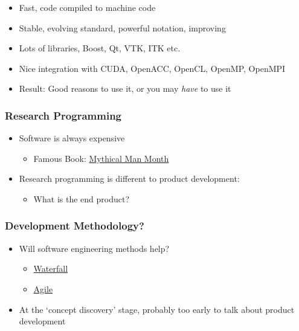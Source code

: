 \begin{itemize}
\tightlist
\item
  Fast, code compiled to machine code
\item
  Stable, evolving standard, powerful notation, improving
\item
  Lots of libraries, Boost, Qt, VTK, ITK etc.
\item
  Nice integration with CUDA, OpenACC, OpenCL, OpenMP, OpenMPI
\item
  Result: Good reasons to use it, or you may \emph{have} to use it
\end{itemize}

\hypertarget{research-programming}{%
\subsubsection{Research Programming}\label{research-programming}}

\begin{itemize}
\tightlist
\item
  Software is always expensive

  \begin{itemize}
  \tightlist
  \item
    Famous Book:
    \href{http://www.amazon.co.uk/Mythical-Man-month-Essays-Software-Engineering/dp/0201835959/ref=sr_1_1?ie=UTF8\&qid=1452507457\&sr=8-1\&keywords=mythical+man+month}{Mythical
    Man Month}
  \end{itemize}
\item
  Research programming is different to product development:

  \begin{itemize}
  \tightlist
  \item
    What is the end product?
  \end{itemize}
\end{itemize}

\hypertarget{development-methodology}{%
\subsubsection{Development Methodology?}\label{development-methodology}}

\begin{itemize}
\tightlist
\item
  Will software engineering methods help?

  \begin{itemize}
  \tightlist
  \item
    \href{https://en.wikipedia.org/wiki/Waterfall_model}{Waterfall}
  \item
    \href{https://en.wikipedia.org/wiki/Agile_software_development}{Agile}
  \end{itemize}
\item
  At the `concept discovery' stage, probably too early to talk about
  product development
\end{itemize}

